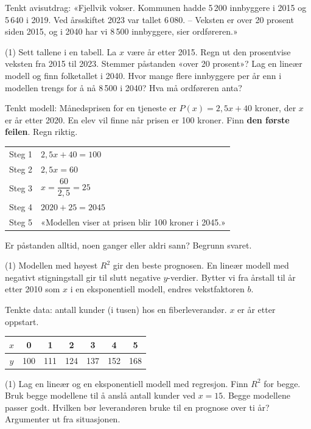 Tenkt avisutdrag: «Fjellvik vokser. Kommunen hadde 5\,200 innbyggere i 2015 og 5\,640 i 2019. Ved årsskiftet 2023 var tallet 6\,080.
– Veksten er over 20 prosent siden 2015, og i 2040 har vi 8\,500 innbyggere, sier ordføreren.»
\begin{tasks}(1)
  \task Sett tallene i en tabell. La $x$ være år etter 2015.
  \task Regn ut den prosentvise veksten fra 2015 til 2023. Stemmer påstanden «over 20 prosent»?
  \task Lag en lineær modell og finn folketallet i 2040.
  \task Hvor mange flere innbyggere per år enn i modellen trengs for å nå 8\,500 i 2040? Hva må ordføreren anta?
\end{tasks}

Tenkt modell: Månedsprisen for en tjeneste er $P(x) = 2{,}5x + 40$ kroner, der $x$ er år etter 2020.
En elev vil finne når prisen er 100 kroner. Finn \textbf{den første feilen}. Regn riktig.

\smallskip
\begin{tabular}{@{}l p{14cm}@{}}
Steg 1 & $2{,}5x + 40 = 100$\\
Steg 2 & $2{,}5x = 60$\\
Steg 3 & $x = \dfrac{60}{2{,}5} = 25$\\
Steg 4 & $2020 + 25 = 2045$\\
Steg 5 & «Modellen viser at prisen blir 100 kroner i 2045.»\\
\end{tabular}


Er påstanden alltid, noen ganger eller aldri sann? Begrunn svaret.
\begin{tasks}(1)
  \task Modellen med høyest $R^2$ gir den beste prognosen.
  \task En lineær modell med negativt stigningstall gir til slutt negative $y$-verdier.
  \task Bytter vi fra årstall til år etter 2010 som $x$ i en eksponentiell modell, endres vekstfaktoren $b$.
\end{tasks}

Tenkte data: antall kunder (i tusen) hos en fiberleverandør. $x$ er år etter oppstart.

\smallskip
\begin{tabular}{@{}c|cccccc@{}}
$x$ & 0 & 1 & 2 & 3 & 4 & 5\\ \hline
$y$ & 100 & 111 & 124 & 137 & 152 & 168\\
\end{tabular}

\begin{tasks}(1)
  \task Lag en lineær og en eksponentiell modell med regresjon. Finn $R^2$ for begge.
  \task Bruk begge modellene til å anslå antall kunder ved $x = 15$.
  \task Begge modellene passer godt. Hvilken bør leverandøren bruke til en prognose over ti år? Argumenter ut fra situasjonen.
\end{tasks}

